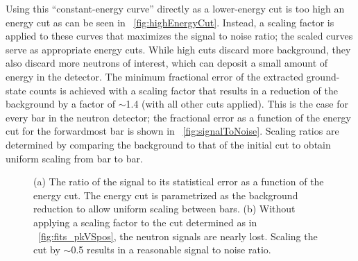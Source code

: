 Using this ``constant-energy curve'' directly as a lower-energy cut is too high an energy cut as can be seen in {\fig}~\ref{fig:highEnergyCut}.  Instead, a scaling factor is applied to these curves that maximizes the signal to noise ratio; the scaled curves serve as appropriate energy cuts.  While high cuts discard more background, they also discard more neutrons of interest, which can deposit a small amount of energy in the detector.  The minimum fractional error of the extracted ground-state counts is achieved with a scaling factor that results in a reduction of the background by a factor of $\sim$1.4 (with all other cuts applied).  This is the case for every bar in the neutron detector; the fractional error as a function of the energy cut for the forwardmost bar is shown in {\fig}~\ref{fig:signalToNoise}.  Scaling ratios are determined by comparing the background to that of the initial cut to obtain uniform scaling from bar to bar.  
\begin{figure}[!htbp]
\centering
{}
\hspace{8pt}
\caption[Optimizing the scale of the low-energy position cut for minimum fractional error.]{(a) The ratio of the signal to its statistical error as a function of the energy cut.  The energy cut is parametrized as the background reduction to allow uniform scaling between bars. (b) Without applying a scaling factor to the cut determined as in {\fig}~\ref{fig:fits_pkVSpos}, the neutron signals are nearly lost.  Scaling the cut by $\sim$0.5 results in a reasonable signal to noise ratio.}
\label{fig:scalingFactorEffect}
\end{figure}

